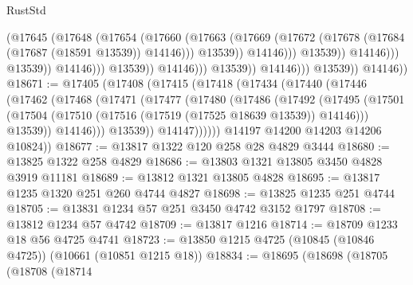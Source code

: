 \begin{lexlean}{RustStd}
\begin{coremodule}
                                                  (@17645
                                                    (@17648
                                                      (@17654
                                                        (@17660
                                                          (@17663
                                                            (@17669
                                                              (@17672
                                                                (@17678
                                                                  (@17684
                                                                    (@17687 (@18591 @13539))
                                                                    @14146)))
                                                              @13539))
                                                          @14146)))
                                                    @13539))
                                                @14146)))
                                          @13539))
                                      @14146)))
                                @13539))
                            @14146)))
                      @13539))
                  @14146)))
            @13539))
        @14146))
@18671 := @17405
    (@17408
      (@17415
        (@17418
          (@17434
            (@17440
              (@17446
                (@17462
                  (@17468
                    (@17471
                      (@17477
                        (@17480
                          (@17486
                            (@17492
                              (@17495
                                (@17501
                                  (@17504 (@17510 (@17516 (@17519 (@17525 @18639 @13539)) @14146)))
                                  @13539))
                              @14146)))
                        @13539))
                    @14147))))))
        @14197
        @14200
        @14203
        @14206
        @10824))
@18677 := @13817 @1322 @120 @258 @28 @4829 @3444
@18680 := @13825 @1322 @258 @4829
@18686 := @13803 @1321 @13805 @3450 @4828 @3919 @11181
@18689 := @13812 @1321 @13805 @4828
@18695 := @13817 @1235 @1320 @251 @260 @4744 @4827
@18698 := @13825 @1235 @251 @4744
@18705 := @13831 @1234 @57 @251 @3450 @4742 @3152 @1797
@18708 := @13812 @1234 @57 @4742
@18709 := @13817 @1216
@18714 := @18709 @1233 @18 @56 @4725 @4741
@18723 := @13850 @1215 @4725 (@10845 (@10846 @4725)) (@10661 (@10851 @1215 @18))
@18834 := @18695
    (@18698
      (@18705
        (@18708
          (@18714

\end{coremodule}
\end{lexlean}

